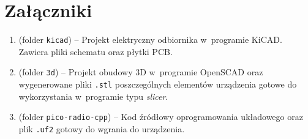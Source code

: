 \documentclass[polish]{aghengthesis}
\begin{document}
%		
%		
			
	
\cleardoublepage
{}
{}
	\printbibliography

\cleardoublepage
{}
{}
	\listoffigures

\cleardoublepage
{}
{}
\chapter*{Załączniki}
	\begin{enumerate}[label=Załącznik \arabic*, itemsep=0.5cm, leftmargin=3.0cm]
		\item (folder \lstinline|kicad|) -- Projekt elektryczny odbiornika w~programie KiCAD. Zawiera pliki schematu oraz płytki PCB.
		\item (folder \lstinline|3d|) -- Projekt obudowy 3D w~programie OpenSCAD oraz wygenerowane pliki \lstinline|.stl| poszczególnych elementów urządzenia gotowe do wykorzystania w~programie typu \textit{slicer}.
		\item (folder \lstinline|pico-radio-cpp|) -- Kod źródłowy oprogramowania układowego oraz plik \lstinline|.uf2| gotowy do wgrania do urządzenia.
	\end{enumerate}

	
\end{document}
